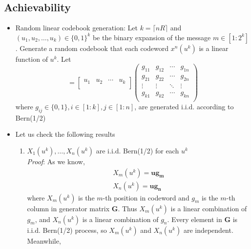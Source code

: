 \documentclass[12]{article}
\begin{document}
\subsection*{Achievability}
\begin{itemize}
	\item Random linear codebook generation: Let $k=\lceil nR\rceil$ and $(u_1,u_2,\dots,u_k)\in\{0,1\}^k$
		be the binary expansion of the message $m\in[1:2^k]$.
		Generate a random codebook that each codeword $x^n(u^k)$ is a linear function of $u^k$. Let\\
		\begin{equation*}
		[	\begin{array}{cccc}
     x_1 & x_2 & \cdots & x_n 
   \end{array}]
   =
     [\begin{array}{cccc}
       u_1 & u_2 & \cdots & u_k \\
     \end{array}]
     \left(
     \begin{array}{cccc}
       g_{11} & g_{12} & \cdots & g_{1n} \\
       g_{21} & g_{22} & \cdots & g_{2n} \\
       \vdots & \vdots & \ddots & \vdots \\
       g_{k1} & g_{k2} & \cdots & g_{kn} \\
     \end{array}
     \right)
		\end{equation*}
		where $g_{ij}\in\{0,1\}, i\in[1:k],j\in[1:n]$, are generated i.i.d. according to Bern(1/2)
	\item Let us check the following results
		\begin{enumerate}
			\item $X_1(u^k),\dots,X_n(u^k)$ are i.i.d. Bern(1/2) for each $u^k$\\
				\emph{Proof}: As we know,
				\begin{equation*}
					\begin{split}
					X_m(u^k)=\mathbf{u g_m}\\
					X_n(u^k)=\mathbf{u g_n}
				\end{split}
				\end{equation*}
				where $X_m(u^k)$ is the $m$-th position in codeword and $g_m$ is the $m$-th column
				in generator matrix $\mathbf{G}$. Thus $X_m(u^k)$ is a linear combination of
				$g_m$, and $X_n(u^k)$ is a linear combination of $g_n$. Every element in $\mathbf{G}$
				is i.i.d. Bern(1/2) process, so $X_m(u^k)$ and $X_n(u^k)$ are independent. Meanwhile,

\end{enumerate}
\end{itemize}
\end{document}
